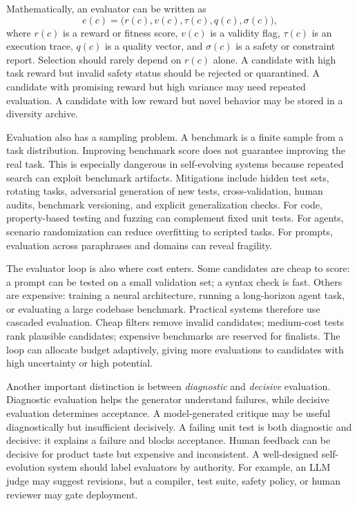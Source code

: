 Mathematically, an evaluator can be written as
\begin{equation}
  e(c) = \bigl(r(c), v(c), \tau(c), q(c), \sigma(c)\bigr),
  \label{eq:evaluator-object}
\end{equation}
where $r(c)$ is a reward or fitness score, $v(c)$ is a validity flag, $\tau(c)$ is an execution trace, $q(c)$ is a quality vector, and $\sigma(c)$ is a safety or constraint report.  Selection should rarely depend on $r(c)$ alone.  A candidate with high task reward but invalid safety status should be rejected or quarantined.  A candidate with promising reward but high variance may need repeated evaluation.  A candidate with low reward but novel behavior may be stored in a diversity archive.

Evaluation also has a sampling problem.  A benchmark is a finite sample from a task distribution.  Improving benchmark score does not guarantee improving the real task.  This is especially dangerous in self-evolving systems because repeated search can exploit benchmark artifacts.  Mitigations include hidden test sets, rotating tasks, adversarial generation of new tests, cross-validation, human audits, benchmark versioning, and explicit generalization checks.  For code, property-based testing and fuzzing can complement fixed unit tests.  For agents, scenario randomization can reduce overfitting to scripted tasks.  For prompts, evaluation across paraphrases and domains can reveal fragility.

The evaluator loop is also where cost enters.  Some candidates are cheap to score: a prompt can be tested on a small validation set; a syntax check is fast.  Others are expensive: training a neural architecture, running a long-horizon agent task, or evaluating a large codebase benchmark.  Practical systems therefore use cascaded evaluation.  Cheap filters remove invalid candidates; medium-cost tests rank plausible candidates; expensive benchmarks are reserved for finalists.  The loop can allocate budget adaptively, giving more evaluations to candidates with high uncertainty or high potential.

Another important distinction is between \emph{diagnostic} and \emph{decisive} evaluation.  Diagnostic evaluation helps the generator understand failures, while decisive evaluation determines acceptance.  A model-generated critique may be useful diagnostically but insufficient decisively.  A failing unit test is both diagnostic and decisive: it explains a failure and blocks acceptance.  Human feedback can be decisive for product taste but expensive and inconsistent.  A well-designed self-evolution system should label evaluators by authority.  For example, an LLM judge may suggest revisions, but a compiler, test suite, safety policy, or human reviewer may gate deployment.

